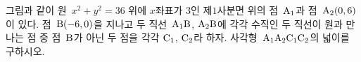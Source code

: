 \noindent\begin{minipage}[t]{0.58\linewidth}\vspace{0pt}\raggedright 그림과 같이 원~$x^2+y^2=36$ 위에 $x$좌표가 $3$인 제$1$사분면 위의 점~$\mathrm{A_1}$과 점~$\mathrm{A_2}(0{,}\mkern3mu 6)$이 있다. 점~$\mathrm{B}(-6{,}\mkern3mu 0)$을 지나고 두 직선~$\mathrm{A_1B}$, $\mathrm{A_2B}$에 각각 수직인 두 직선이 원과 만나는 점 중 점~$\mathrm{B}$가 아닌 두 점을 각각 $\mathrm{C_1}$, $\mathrm{C_2}$라 하자. 사각형~$\mathrm{A_1A_2C_1C_2}$의 넓이를 구하시오.\end{minipage}\hfill\begin{minipage}[t]{0.4\linewidth}\vspace{0pt}\centering \resizebox{\ifdim\width>\linewidth\linewidth\else\width\fi}{!}{}\end{minipage}\par
